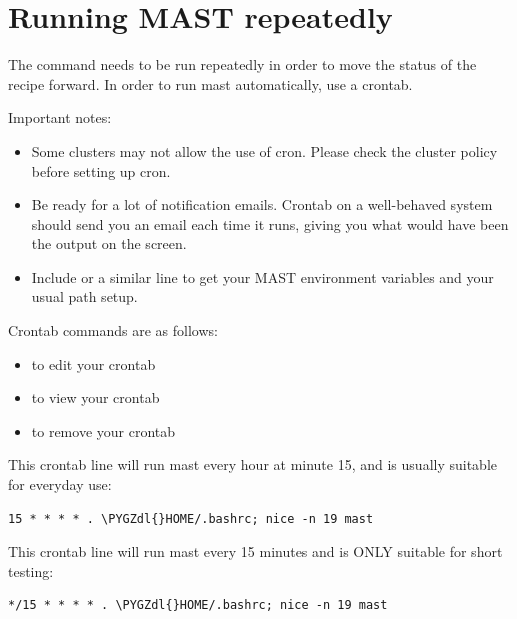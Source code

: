 \documentclass[letterpaper,10pt,english]{sphinxmanual}
\def\PYGZdl{\char`\$}
\begin{document}
\section{Running MAST repeatedly}
\label{5_0_runningmast:running-mast-repeatedly}
The command  needs to be run repeatedly in order to move the status of the recipe forward. In order to run mast automatically, use a crontab.

Important notes:
\begin{itemize}
\item {} 
Some clusters may not allow the use of cron. Please check the cluster policy before setting up cron.

\item {} 
Be ready for a lot of notification emails. Crontab on a well-behaved system should send you an email each time it runs, giving you what would have been the output on the screen.

\item {} 
Include  or a similar line to get your MAST environment variables and your usual path setup.

\end{itemize}

Crontab commands are as follows:
\begin{itemize}
\item {} 
 to edit your crontab

\item {} 
 to view your crontab

\item {} 
 to remove your crontab

\end{itemize}

This crontab line will run mast every hour at minute 15, and is usually suitable for everyday use:

\begin{Verbatim}[commandchars=\\\{\}]
15 * * * * . \PYGZdl{}HOME/.bashrc; nice -n 19 mast
\end{Verbatim}

This crontab line will run mast every 15 minutes and is ONLY suitable for short testing:

\begin{Verbatim}[commandchars=\\\{\}]
*/15 * * * * . \PYGZdl{}HOME/.bashrc; nice -n 19 mast
\end{Verbatim}
\end{document}
